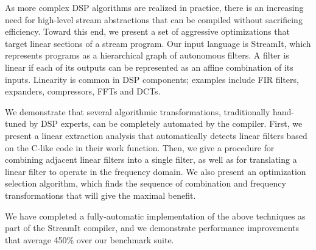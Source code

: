 As more complex DSP algorithms are realized in practice, there is an
increasing need for high-level stream abstractions that can be
compiled without sacrificing efficiency.  Toward this end, we present
a set of aggressive optimizations that target linear sections of a
stream program.  Our input language is StreamIt, which represents
programs as a hierarchical graph of autonomous filters.  A filter is
linear if each of its outputs can be represented as an affine
combination of its inputs.  Linearity is common in DSP components;
examples include FIR filters, expanders, compressors, FFTs and DCTs.

We demonstrate that several algorithmic transformations, traditionally
hand-tuned by DSP experts, can be completely automated by the
compiler.  First, we present a linear extraction analysis that
automatically detects linear filters based on the C-like code in their
work function.  Then, we give a procedure for combining adjacent
linear filters into a single filter, as well as for translating a
linear filter to operate in the frequency domain.  We also present an
optimization selection algorithm, which finds the sequence of
combination and frequency transformations that will give the maximal
benefit.

We have completed a fully-automatic implementation of the above
techniques as part of the StreamIt compiler, and we demonstrate
performance improvements that average 450\% over our benchmark suite.
